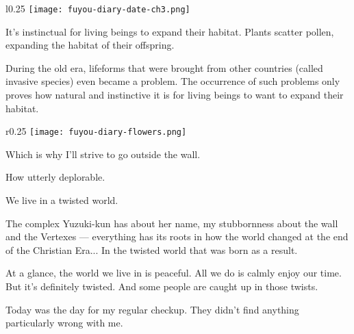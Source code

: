 \newpage
\begin{center}
\begin{graphpaperBox}[enhanced,box align=center,colframe=diaryborder,width=0.8\textwidth]
\begin{wrapfigure}{l}{0.25\textwidth}
\hspace*{-5mm}\texttt{[image: fuyou-diary-date-ch3.png]}
\end{wrapfigure}

It's instinctual for living beings to expand their habitat. Plants scatter pollen, expanding the habitat of their offspring.

During the old era, lifeforms that were brought from other countries (called invasive species) even became a problem. The occurrence of such problems only proves how natural and instinctive it is for living beings to want to expand their habitat.

\begin{wrapfigure}{r}{0.25\textwidth}
\texttt{[image: fuyou-diary-flowers.png]}
\end{wrapfigure}

Which is why I'll strive to go outside the wall.

How utterly deplorable.

We live in a twisted world.

The complex Yuzuki-kun has about her name, my stubbornness about the wall and the Vertexes --- everything has its roots in how the world changed at the end of the Christian Era... In the twisted world that was born as a result.

At a glance, the world we live in is peaceful. All we do is calmly enjoy our time. But it's definitely twisted. And some people are caught up in those twists.

Today was the day for my regular checkup. They didn't find anything particularly wrong with me.

\end{graphpaperBox}
\end{center}
